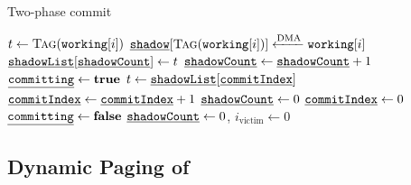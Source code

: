 \begin{algorithm}[t]
	\caption{Two-phase commit}
	\label{algo:commit}
	\scriptsize
	\begin{algorithmic}[1]
         
                \State $t \gets \Call{Tag}{\texttt{working}[i]}$
                \State $\texttt{\underline{shadow}}[\Call{Tag}{\texttt{working}[i]}] \xleftarrow{\text{DMA}} \texttt{working}[i]$
                \State $\texttt{\underline{shadowList}}[\texttt{\underline{shadowCount}}] \gets t$
                \State $\texttt{\underline{shadowCount}} \gets \texttt{\underline{shadowCount}} + 1$
            \EndFor
            \State {}
        \EndProcedure
         
            \State $\texttt{\underline{committing}} \gets \textbf{true}$
                \State $t \gets \texttt{\underline{shadowList}}[\texttt{\underline{commitIndex}}]$
                \State {}
                \State $\texttt{\underline{commitIndex}} \gets \texttt{\underline{commitIndex}} + 1$
            \EndWhile
            \State $\texttt{\underline{shadowCount}} \gets 0$
            \State $\texttt{\underline{commitIndex}} \gets 0$
            \State $\texttt{\underline{committing}} \gets \textbf{false}$
        \EndProcedure
         
             
            \EndIf 
            \State $\texttt{\underline{shadowCount}} \gets 0$, $i_\text{victim} \gets 0$
        \EndProcedure
	\end{algorithmic}
\end{algorithm}



\subsection{Dynamic Paging of \sys}

